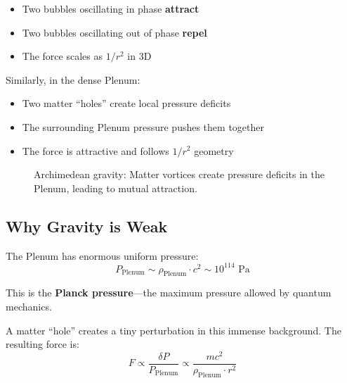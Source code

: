 \begin{itemize}
    \item Two bubbles oscillating in phase \textbf{attract}
    \item Two bubbles oscillating out of phase \textbf{repel}
    \item The force scales as $1/r^2$ in 3D
\end{itemize}

Similarly, in the dense Plenum:
\begin{itemize}
    \item Two matter ``holes'' create local pressure deficits
    \item The surrounding Plenum pressure pushes them together
    \item The force is attractive and follows $1/r^2$ geometry
\end{itemize}

\begin{figure}[h]
\centering
{}
\caption{Archimedean gravity: Matter vortices create pressure deficits in the Plenum, leading to mutual attraction.}
\label{fig:archimedean}
\end{figure}

\subsection{Why Gravity is Weak}

The Plenum has enormous uniform pressure:
\begin{equation}
P_{\text{Plenum}} \sim \rho_{\text{Plenum}} \cdot c^2 \sim 10^{114} \text{ Pa}
\end{equation}

This is the \textbf{Planck pressure}—the maximum pressure allowed by quantum mechanics.

A matter ``hole'' creates a tiny perturbation in this immense background. The resulting force is:
\begin{equation}
F \propto \frac{\delta P}{P_{\text{Plenum}}} \propto \frac{mc^2}{\rho_{\text{Plenum}} \cdot r^2}
\end{equation}

